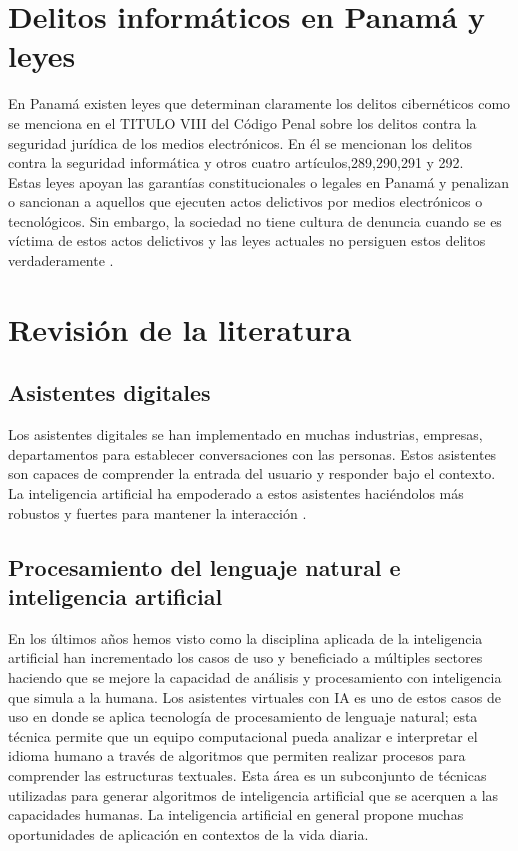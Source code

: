 \section{ Delitos informáticos en Panamá y leyes}\label{section:Delitos informáticos en Panamá y leyes}
En Panamá existen leyes que determinan claramente los delitos cibernéticos como se menciona en el TITULO VIII del Código Penal sobre los delitos contra la seguridad jurídica de los medios electrónicos. En él se mencionan los delitos contra la seguridad informática y otros cuatro artículos,289,290,291 y 292. \\
Estas leyes apoyan las garantías constitucionales o legales en Panamá y penalizan o sancionan a aquellos que ejecuten actos delictivos por medios electrónicos o tecnológicos. Sin embargo, la sociedad no tiene cultura de denuncia cuando se es víctima de estos actos delictivos y las leyes actuales no persiguen estos delitos verdaderamente \cite{Francis2022}.

\section{Revisión de la literatura}\label{section: Revisión de la literatura}
\subsection{Asistentes digitales}
Los asistentes digitales se han implementado en muchas industrias, empresas, departamentos para establecer conversaciones con las personas. Estos asistentes son capaces de comprender la entrada del usuario y responder bajo el contexto. La inteligencia artificial ha empoderado a estos asistentes haciéndolos más robustos y fuertes para mantener la interacción \cite{Urribarri2022}.
\subsection{Procesamiento del lenguaje natural e inteligencia artificial}\label{section: NPT e IA}
En los últimos años hemos visto como la disciplina aplicada de la inteligencia artificial han incrementado los casos de uso y beneficiado a múltiples sectores haciendo que se mejore la capacidad de análisis y procesamiento con inteligencia que simula a la humana. Los asistentes virtuales con IA es uno de estos casos de uso en donde se aplica tecnología de procesamiento de lenguaje natural; esta técnica permite que un equipo computacional pueda analizar e interpretar el idioma humano a través de algoritmos que permiten realizar procesos para comprender las estructuras textuales. Esta área es un subconjunto de técnicas utilizadas para generar algoritmos de inteligencia artificial que se acerquen a las capacidades humanas. La inteligencia artificial en general propone muchas oportunidades de aplicación en contextos de la vida diaria.
